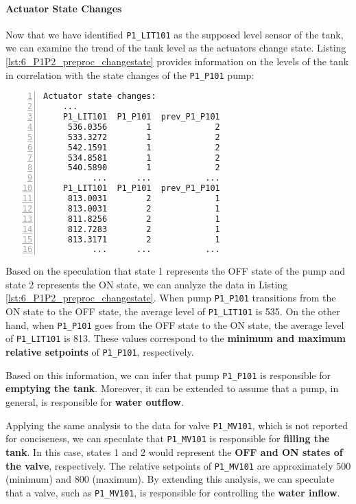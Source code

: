 \paragraph{Actuator State Changes}
\label{par:6_preproc_P1P2_actuator_state_changes}
Now that we have identified \texttt{P1\_LIT101} as the supposed level sensor of the tank, we can examine the trend of the tank level as the actuators change state. Listing \ref{lst:6_P1P2_preproc_changestate} provides information on the levels of the tank in correlation with the state changes of the \texttt{P1\_P101} pump:

\begin{lstlisting}[language=bash, numbers=left, caption=\texttt{P1\_P101} state changes in relation to \texttt{P1\_LIT101}, label=lst:6_P1P2_preproc_changestate]
	Actuator state changes:
	...
	P1_LIT101  P1_P101  prev_P1_P101
	 536.0356        1             2
	 533.3272        1             2
	 542.1591        1             2
	 534.8581        1             2
	 540.5890        1             2
	      ...      ...           ...
	P1_LIT101  P1_P101  prev_P1_P101
	 813.0031        2             1
	 813.0031        2             1
	 811.8256        2             1
	 812.7283        2             1
	 813.3171        2             1
	      ...      ...           ...
\end{lstlisting}

Based on the speculation that state 1 represents the OFF state of the pump and state 2 represents the ON state, we can analyze the data in Listing \ref{lst:6_P1P2_preproc_changestate}. When pump \texttt{P1\_P101} transitions from the ON state to the OFF state, the average level of \texttt{P1\_LIT101} is 535. On the other hand, when \texttt{P1\_P101} goes from the OFF state to the ON state, the average level of \texttt{P1\_LIT101} is 813. These values correspond to the \textbf{minimum and maximum relative setpoints} of \texttt{P1\_P101}, respectively. 

Based on this information, we can infer that pump \texttt{P1\_P101} is responsible for \textbf{emptying the tank}. Moreover, it can be extended to assume that a pump, in general, is responsible for \textbf{water outflow}.

\bigskip
Applying the same analysis to the data for valve \texttt{P1\_MV101}, which is not reported for conciseness, we can speculate that \texttt{P1\_MV101} is responsible for \textbf{filling the tank}. In this case, states 1 and 2 would represent the \textbf{OFF and ON states of the valve}, respectively. The relative setpoints of \texttt{P1\_MV101} are approximately 500 (minimum) and 800 (maximum).
By extending this analysis, we can speculate that a valve, such as \texttt{P1\_MV101}, is responsible for controlling the \textbf{water inflow}.


